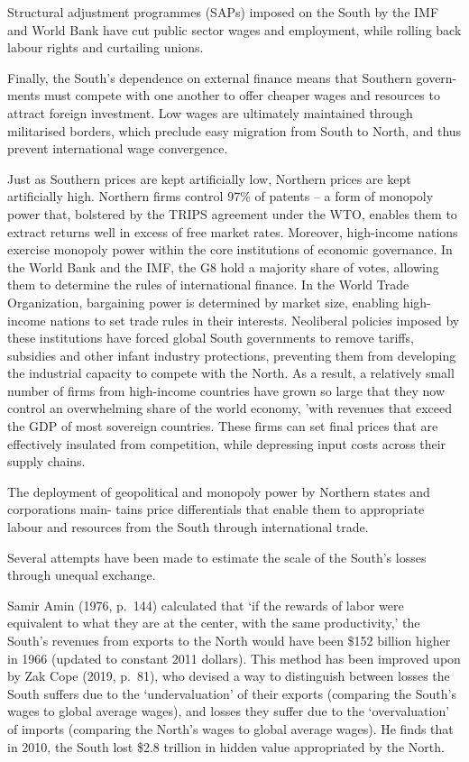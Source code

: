 \documentclass[
]{book}
\begin{document}
Structural adjustment programmes (SAPs) imposed on the South
by the IMF and World Bank have cut public sector wages and employment,
while rolling back labour rights and curtailing unions.

Finally, the South's dependence on external finance means that Southern govern-
ments must compete with one another to offer cheaper wages and resources to attract foreign
investment.
Low wages are ultimately maintained through militarised borders,
which preclude easy migration from South to North, and thus prevent international wage
convergence.

Just as Southern prices are kept artificially low, Northern prices are kept
artificially high.
Northern firms control 97\% of patents -- a form of monopoly power that,
bolstered by the TRIPS agreement under the WTO, enables them to
extract returns well in excess of free market rates.
Moreover, high-income nations exercise monopoly power within the core institutions
of economic governance.
In the World Bank and the IMF, the G8 hold a majority share of votes, allowing
them to determine the rules of international finance.
In the World Trade Organization, bargaining power is determined by market size,
enabling high-income nations to set trade rules in their interests.
Neoliberal policies imposed by these institutions have forced
global South governments to remove tariffs, subsidies and other infant industry protections,
preventing them from developing the industrial capacity to compete with the North.
As a result, a relatively small number of firms from high-income countries
have grown so large that they now control an overwhelming share of the world economy,
'with revenues that exceed the GDP of most sovereign countries.
These firms can set final prices that are effectively insulated from competition,
while depressing input costs across their supply chains.

The deployment of geopolitical and monopoly power by Northern states and corporations main-
tains price differentials that enable them to appropriate labour and resources from the South
through international trade.

Several attempts have been made to estimate the scale of the South's losses through unequal
exchange.

Samir Amin (1976, p.~144) calculated that `if the rewards of labor were equivalent to
what they are at the center, with the same productivity,' the South's revenues from exports to the
North would have been \$152 billion higher in 1966 (updated to constant 2011 dollars). This
method has been improved upon by Zak Cope (2019, p.~81), who devised a way to distinguish
between losses the South suffers due to the `undervaluation' of their exports (comparing the
South's wages to global average wages), and losses they suffer due to the `overvaluation' of
imports (comparing the North's wages to global average wages). He finds that in 2010, the South
lost \$2.8 trillion in hidden value appropriated by the North.
\end{document}
